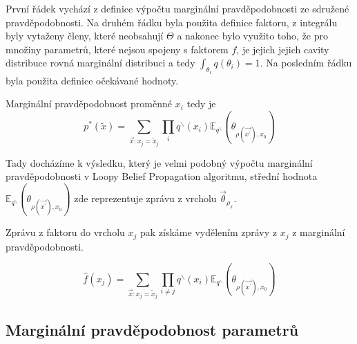 První řádek vychází z definice výpočtu marginální pravděpodobnosti ze sdružené
pravděpodobnosti.
Na druhém řádku byla použita definice faktoru, z integrálu byly vytaženy členy,
které neobsahují $\Theta$ a nakonec bylo využito toho, že pro množiny
parametrů, které nejsou spojeny s faktorem $f$, je jejich jejich cavity
distribuce rovná marginální distribuci a tedy $\int_{\theta_i} q(\theta_i) =
1$. Na posledním řádku byla použita definice očekávané hodnoty.

Marginální pravděpodobnost proměnné $x_i$ tedy je
\begin{equation}
p^*(\tilde x) =
    \sum_{\vec{x}: x_j = \tilde{x}_j}
        \prod_i
            q^\backslash(x_i)
            \mathbb{E}_{q^\backslash}
                (\theta_{\rho(\vec{x^\prime}), x_0})
\end{equation}

Tady docházíme k výsledku, který je velmi podobný výpočtu marginální
pravděpodobnosti v Loopy Belief Propagation algoritmu, střední hodnota
$\mathbb{E}_{q^\backslash} (\theta_{\rho(\vec{x^\prime}), x_0})$ zde
reprezentuje zprávu z vrcholu $\vec{\theta}_{\rho_x}$.

Zprávu z faktoru do vrcholu $x_j$ pak získáme vydělením zprávy z $x_j$ z
marginální pravděpodobnosti.

\begin{equation}
\hat f(x_j) =
    \sum_{\vec{x}: x_j = \tilde{x}_j}
        \prod_{i \ne j}
            q^\backslash(x_i)
            \mathbb{E}_{q^\backslash}
                (\theta_{\rho(\vec{x^\prime}), x_0})
\label{eq:msgfromftox}
\end{equation}

\subsection{Marginální pravděpodobnost parametrů}


